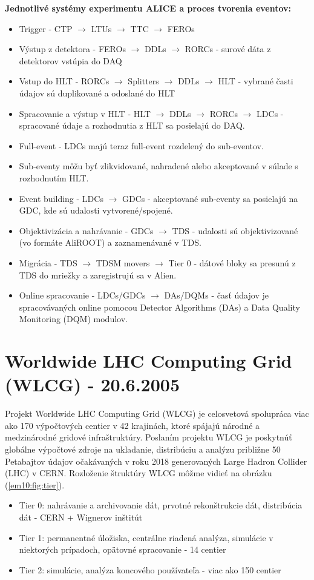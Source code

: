 \documentclass[../../main.tex]{subfiles}
\begin{document}
\textbf{Jednotlivé systémy experimentu ALICE a proces tvorenia eventov:}
\begin{itemize}
\item Trigger - CTP $\rightarrow$ LTUs $\rightarrow$ TTC $\rightarrow$ FEROs
\item Výstup z detektora - FEROs $\rightarrow$ DDLs $\rightarrow$ RORCs - surové dáta z detektorov vstúpia do DAQ
\item Vstup do HLT - RORCs $\rightarrow$ Splitters $\rightarrow$ DDLs $\rightarrow$ HLT - vybrané časti údajov sú duplikované a odoslané do HLT
\item Spracovanie a výstup v HLT - HLT $\rightarrow$ DDLs $\rightarrow$ RORCs $\rightarrow$ LDCs - spracované údaje a rozhodnutia z HLT sa posielajú do DAQ.
\item Full-event - LDCs majú teraz full-event rozdelený do sub-eventov.
\item Sub-eventy môžu byť zlikvidované, nahradené alebo akceptované v súlade s rozhodnutím HLT.
\item Event building - LDCs $\rightarrow$ GDCs - akceptované sub-eventy sa posielajú na GDC, kde sú udalosti vytvorené/spojené.
\item Objektivizácia a nahrávanie - GDCs $\rightarrow$ TDS - udalosti sú objektivizované (vo formáte AliROOT) a zaznamenávané v TDS.
\item Migrácia - TDS $\rightarrow$ TDSM movers $\rightarrow$ Tier 0 - dátové bloky sa presunú z TDS do mriežky a zaregistrujú sa v Alien.
\item Online spracovanie - LDCs/GDCs $\rightarrow$ DAs/DQMs - časť údajov je spracovávaných online pomocou Detector Algorithms (DAs) a Data Quality Monitoring (DQM) modulov.
\end{itemize}

\section{Worldwide LHC Computing Grid (WLCG) - 20.6.2005}
Projekt Worldwide LHC Computing Grid (WLCG) je celosvetová spolupráca viac ako 170 výpočtových centier v 42 krajinách, ktoré spájajú národné a medzinárodné gridové infraštruktúry. Poslaním projektu WLCG je poskytnúť globálne výpočtové zdroje na ukladanie, distribúciu a analýzu približne 50 Petabajtov údajov očakávaných v roku 2018 generovaných Large Hadron Collider (LHC) v CERN. Rozloženie štruktúry WLCG môžme vidieť na obrázku (\ref{em10:fig:tier}).

\begin{itemize}
\item Tier 0: nahrávanie a archivovanie dát, prvotné rekonštrukcie dát, distribúcia dát - CERN + Wignerov inštitút
\item Tier 1: permanentné úložiska, centrálne riadená analýza, simulácie v niektorých prípadoch, opätovné spracovanie - 14 centier
\item Tier 2: simulácie, analýza koncového používateľa - viac ako 150 centier
\end{itemize}
\end{document}
